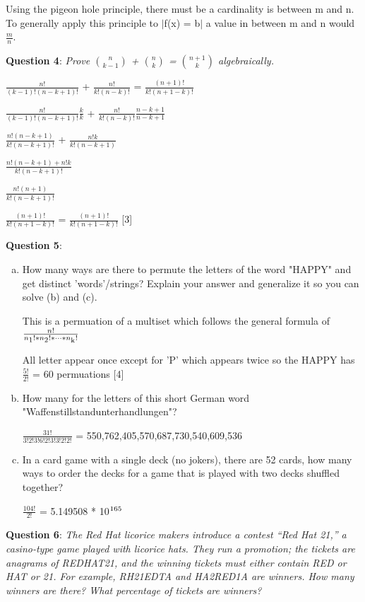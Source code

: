 \documentclass{article} %
\newcommand{\question}[2][]{\begin{flushleft}
        \textbf{Question #1}: \textit{#2}

\end{flushleft}}
\begin{document}
    Using the pigeon hole principle, there must be a cardinality is between m and n. To generally apply this principle to $\mid$f(x) = b$\mid$ a value in between m and n would $\frac{m}{n}$.

    \question[4]{Prove $\binom{n}{k - 1}$ + $\binom{n}{k}$ = $\binom{n + 1}{k}$ algebraically.}

    $\frac{n!}{(k-1)!(n-k+1)!}$ + $\frac{n!}{k!(n-k)!}$ = $\frac{(n+1)!}{k!(n+1-k)!}$

    $\frac{n!}{(k-1)!(n-k+1)!}$$\frac{k}{k}$ + $\frac{n!}{k!(n-k)!}$$\frac{n-k+1}{n-k+1}$

    $\frac{n!(n-k+1)}{k!(n-k+1)!}$ + $\frac{n!k}{k!(n-k+1)}$

    $\frac{n!(n-k+1)+n!k}{k!(n-k+1)!}$

    $\frac{n!(n+1)}{k!(n-k+1)!}$

    $\frac{(n+1)!}{k!(n+1-k)!}$ = $\frac{(n+1)!}{k!(n+1-k)!}$ [3]

    \question[5]{}
    \begin{enumerate}[(a)]
        \item {How many ways are there to permute the letters of the word "HAPPY" and get distinct 'words'/strings? Explain your answer and generalize it so you can solve (b) and (c).}
        
        This is a permuation of a multiset which follows the general formula of $\frac{n!}{n\textsubscript{1}! * n\textsubscript{2}! * \dots * n\textsubscript{k}!}$

        All letter appear once except for 'P' which appears twice so the HAPPY has $\frac{5!}{2!}$ = 60 permuations [4]
        \item {How many for the letters of this short German word "Waffenstillstandunterhandlungen"?}
        
        $\frac{31!}{3!2!3!6!2!3!3!2!2!}$ = 550,762,405,570,687,730,540,609,536
        \item {In a card game with a single deck (no jokers), there are 52 cards, how many ways to order the decks for a game that is played with two decks shuffled together?}
        
        $\frac{104!}{2!}$ = 5.149508 * 10$\textsuperscript{165}$
    \end{enumerate}

    \question[6]{The Red Hat licorice makers introduce a contest “Red Hat 21,” a casino-type game played with licorice hats. They run a promotion; the tickets are anagrams of REDHAT21, and the winning tickets must either contain RED or HAT or 21. For example, RH21EDTA and HA2RED1A are winners. How many winners are there? What percentage of tickets are winners?}
\end{document}
